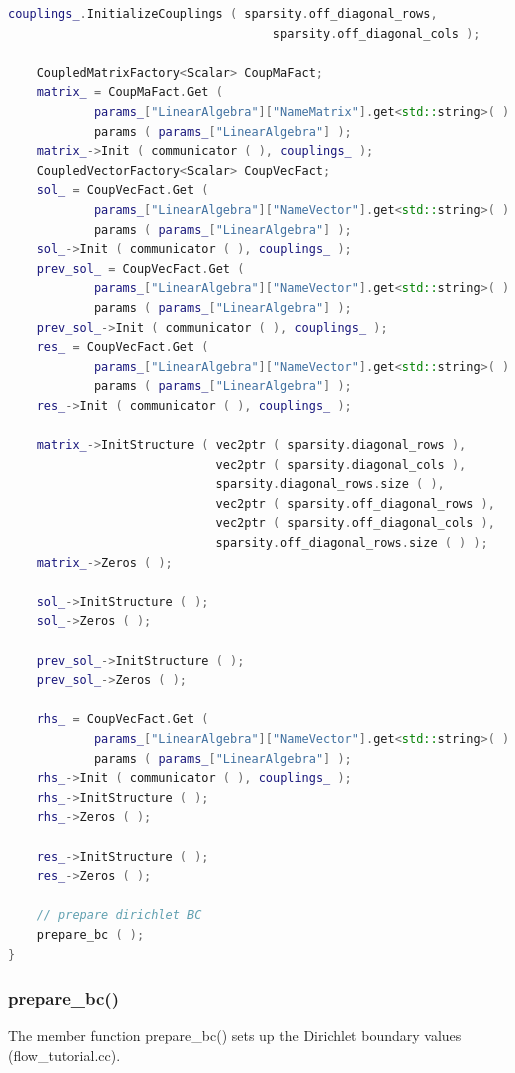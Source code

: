 \documentclass[a4paper, 11pt, twoside]{article}
\begin{document}
\begin{lstlisting}[language=C++, basicstyle={\footnotesize, \ttfamily}, keywordstyle=\color{blue},  numbers=none, tabsize=4]
    couplings_.InitializeCouplings ( sparsity.off_diagonal_rows,
                                     sparsity.off_diagonal_cols );

    CoupledMatrixFactory<Scalar> CoupMaFact;
    matrix_ = CoupMaFact.Get (
            params_["LinearAlgebra"]["NameMatrix"].get<std::string>( ) )->
            params ( params_["LinearAlgebra"] );
    matrix_->Init ( communicator ( ), couplings_ );
    CoupledVectorFactory<Scalar> CoupVecFact;
    sol_ = CoupVecFact.Get (
            params_["LinearAlgebra"]["NameVector"].get<std::string>( ) )->
            params ( params_["LinearAlgebra"] );
    sol_->Init ( communicator ( ), couplings_ );
    prev_sol_ = CoupVecFact.Get (
            params_["LinearAlgebra"]["NameVector"].get<std::string>( ) )->
            params ( params_["LinearAlgebra"] );
    prev_sol_->Init ( communicator ( ), couplings_ );
    res_ = CoupVecFact.Get (
            params_["LinearAlgebra"]["NameVector"].get<std::string>( ) )->
            params ( params_["LinearAlgebra"] );
    res_->Init ( communicator ( ), couplings_ );

    matrix_->InitStructure ( vec2ptr ( sparsity.diagonal_rows ),
                             vec2ptr ( sparsity.diagonal_cols ),
                             sparsity.diagonal_rows.size ( ),
                             vec2ptr ( sparsity.off_diagonal_rows ),
                             vec2ptr ( sparsity.off_diagonal_cols ),
                             sparsity.off_diagonal_rows.size ( ) );
    matrix_->Zeros ( );

    sol_->InitStructure ( );
    sol_->Zeros ( );

    prev_sol_->InitStructure ( );
    prev_sol_->Zeros ( );

    rhs_ = CoupVecFact.Get (
            params_["LinearAlgebra"]["NameVector"].get<std::string>( ) )->
            params ( params_["LinearAlgebra"] );
    rhs_->Init ( communicator ( ), couplings_ );
    rhs_->InitStructure ( );
    rhs_->Zeros ( );

    res_->InitStructure ( );
    res_->Zeros ( );

    // prepare dirichlet BC
    prepare_bc ( );
}
\end{lstlisting}

\subsubsection{prepare\_bc()}
The member function prepare\_bc() sets up the Dirichlet boundary values (flow\_tutorial.cc).
\end{document}
